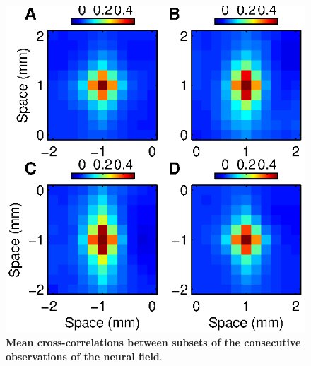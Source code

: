 \documentclass[]{article}
\begin{document}
\begin{figure}[!ht]
\begin{center}
\includegraphics{./Figures/HomoTestCrossCorr.eps}
\end{center}
\caption{{\bf Mean cross-correlations between subsets of the consecutive observations of the neural field}.}
\label{fig:HomogeneityTest}
\end{figure}
\end{document}
